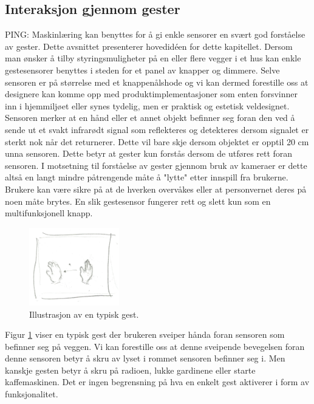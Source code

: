 \subsection*{Interaksjon gjennom gester}
\label{ch:2.minide}
{\color{red}PING: Maskinlæring kan benyttes for å gi enkle sensorer en svært god forståelse av gester.}
Dette avsnittet presenterer hovedidéen for dette kapitellet. 
Dersom man ønsker å tilby styringsmuligheter på en eller flere vegger i et hus kan enkle gestesensorer benyttes i steden for et panel av knapper og dimmere. Selve sensoren er på størrelse med et knappenålshode og vi kan dermed forestille oss at designere kan komme opp med produktimplementasjoner som enten forsvinner inn i hjemmiljøet eller synes tydelig, men er praktisk og estetisk veldesignet. Sensoren merker at en hånd eller et annet objekt befinner seg foran den ved å sende ut et svakt infrarødt signal som reflekteres og detekteres dersom signalet er sterkt nok når det returnerer. Dette vil bare skje dersom objektet er opptil 20 cm unna sensoren. Dette betyr at gester kun forstås dersom de utføres rett foran sensoren. I motsetning til forståelse av gester gjennom bruk av kameraer er dette altså en langt mindre påtrengende måte å "lytte" etter innspill fra brukerne. Brukere kan være sikre på at de hverken overvåkes eller at personvernet deres på noen måte brytes. En slik gestesensor fungerer rett og slett kun som en multifunksjonell knapp.

\begin{figure}
    \vspace{-20pt}
  \begin{center}
    \includegraphics[width=0.35\textwidth]{fig/swipe-l-r}
  \end{center}
  \vspace{-20pt}
  \caption{Illustrasjon av en typisk gest.}
  \label{fig:gest}
  \vspace{-7pt}
\end{figure}

Figur \ref{fig:gest} viser en typisk gest der brukeren sveiper hånda foran sensoren som befinner seg på veggen. Vi kan forestille oss at denne sveipende bevegelsen foran denne sensoren betyr å skru av lyset i rommet sensoren befinner seg i. Men kanskje gesten betyr å skru på radioen, lukke gardinene eller starte kaffemaskinen. Det er ingen begrensning på hva en enkelt gest aktiverer i form av funksjonalitet.

